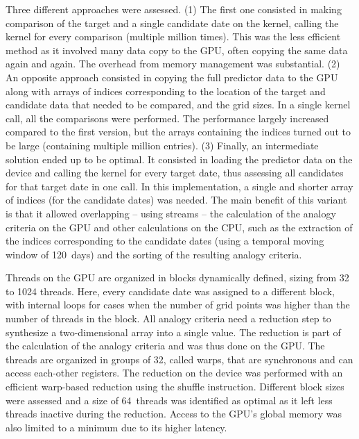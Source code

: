 \documentclass[draft]{agujournal2019}
\begin{document}
Three different approaches were assessed. (1) The first one consisted in making comparison of the target and a single candidate date on the kernel, calling the kernel for every comparison (multiple million times). This was the less efficient method as it involved many data copy to the GPU, often copying the same data again and again. The overhead from memory management was substantial. (2) An opposite approach consisted in copying the full predictor data to the GPU along with arrays of indices corresponding to the location of the target and candidate data that needed to be compared, and the grid sizes. In a single kernel call, all the comparisons were performed. The performance largely increased compared to the first version, but the arrays containing the indices turned out to be large (containing multiple million entries). (3) Finally, an intermediate solution ended up to be optimal. It consisted in loading the predictor data on the device and calling the kernel for every target date, thus assessing all candidates for that target date in one call. In this implementation, a single and shorter array of indices (for the candidate dates) was needed. The main benefit of this variant is that it allowed overlapping -- using streams -- the calculation of the analogy criteria on the GPU and other calculations on the CPU, such as the extraction of the indices corresponding to the candidate dates (using a temporal moving window of 120~days) and the sorting of the resulting analogy criteria.

Threads on the GPU are organized in blocks dynamically defined, sizing from 32 to 1024 threads. Here, every candidate date was assigned to a different block, with internal loops for cases when the number of grid points was higher than the number of threads in the block. All analogy criteria need a reduction step to synthesize a two-dimensional array into a single value. The reduction is part of the calculation of the analogy criteria and was thus done on the GPU. The threads are organized in groups of 32, called warps, that are synchronous and can access each-other registers. The reduction on the device was performed with an efficient warp-based reduction using the shuffle instruction. Different block sizes were assessed and a size of 64~threads was identified as optimal as it left less threads inactive during the reduction. Access to the GPU's global memory was also limited to a minimum due to its higher latency.
\end{document}
